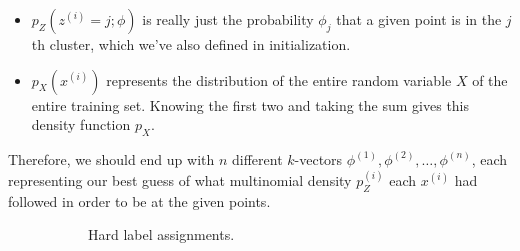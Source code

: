 \begin{definition}[EM Algorithm]
\begin{enumerate}
\begin{itemize}
              \item $p_Z(z^{(i)} = j; \phi)$ is really just the probability $\phi_j$ that a given point is in the $j$th cluster, which we've also defined in initialization.
              \item $p_X(x^{(i)})$ represents the distribution of the entire random variable $X$ of the entire training set. Knowing the first two and taking the sum gives this density function $p_X$.
          \end{itemize}
          Therefore, we should end up with $n$ different $k$-vectors $\phi^{(1)}, \phi^{(2)}, \ldots, \phi^{(n)}$, each representing our best guess of what multinomial density $p_Z^{(i)}$ each $x^{(i)}$ had followed in order to be at the given points.


          \begin{figure}[H]
            \centering
            \begin{subfigure}[b]{0.48\textwidth}
              \centering
              \caption{Hard label assignments.}
              \label{fig:hard-guesses}
            \end{subfigure}
            \hfill 
            \begin{subfigure}[b]{0.48\textwidth}
              \centering
\end{subfigure}
\end{figure}
\end{enumerate}
\end{definition}
